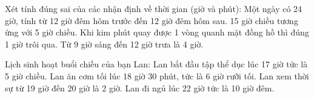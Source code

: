 \begin{ex} %
Xét tính đúng sai của các nhận định về thời gian (giờ và phút):
\choiceTF
{\True Một ngày có 24 giờ, tính từ 12 giờ đêm hôm trước đến 12 giờ đêm hôm sau.}
{15 giờ chiều tương ứng với 5 giờ chiều.}
{\True Khi kim phút quay được 1 vòng quanh mặt đồng hồ thì đúng 1 giờ trôi qua.}
{Từ 9 giờ sáng đến 12 giờ trưa là 4 giờ.}
\end{ex}

\begin{ex} %
Lịch sinh hoạt buổi chiều của bạn Lan:
\choiceTF
{\True Lan bắt đầu tập thể dục lúc 17 giờ tức là 5 giờ chiều.}
{\True Lan ăn cơm tối lúc 18 giờ 30 phút, tức là 6 giờ rưỡi tối.}
{Lan xem thời sự từ 19 giờ đến 20 giờ là 2 giờ.}
{\True Lan đi ngủ lúc 22 giờ tức là 10 giờ đêm.}
\end{ex}

